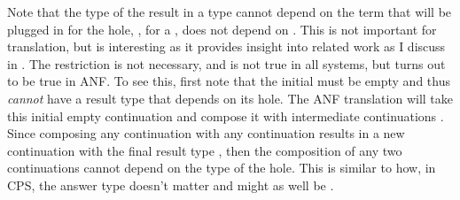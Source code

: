Note that the type of the result in a  type cannot depend on
the term that will be plugged in for the hole, \ie, for a 
\im{\tK : (\tN : \tA) \Rightarrow \tB}, \im{\tB} does not depend on \im{\tN}.
This is not important for  translation, but is interesting as it
provides insight into related work as I discuss in .
The restriction is not necessary, and is not true in all systems, but turns out
to be true in ANF.
To see this, first note that the initial  must be empty and
thus \emph{cannot} have a result type that depends on its hole.
The ANF translation will take this initial empty continuation and compose it
with intermediate continuations \im{\tKpr}.
Since composing any continuation \im{\tK : (\tN : \tA) \Rightarrow \tB} with any
continuation \im{\tKpr} results in a new continuation with the final result type
\im{\tB}, then the composition of any two continuations cannot depend on the
type of the hole.
This is similar to how, in CPS, the answer type doesn't matter and might as well
be \im{\bot}.

